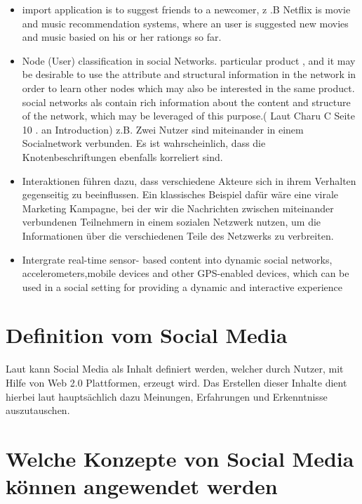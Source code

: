 \begin{itemize}
\item import application is to suggest  friends to a newcomer, z .B Netflix   is movie and music recommendation systems, where an user is suggested new movies and music basied on his or her rationgs so far.
\item Node (User) classification in social Networks. particular product , and it may be desirable to use the attribute and structural information in the network in order to learn other nodes which may also be interested in the same product. social networks als contain rich information about the content and structure of the network, which may be leveraged of this purpose.( Laut Charu C Seite 10 . an Introduction) z.B.  Zwei Nutzer sind miteinander in einem Socialnetwork verbunden. Es ist wahrscheinlich, dass die Knotenbeschriftungen ebenfalls korreliert sind.
\item Interaktionen führen dazu, dass verschiedene Akteure sich in ihrem Verhalten gegenseitig zu beeinflussen. Ein klassisches Beispiel dafür wäre eine virale Marketing Kampagne, bei der wir die Nachrichten zwischen miteinander verbundenen Teilnehmern in einem sozialen Netzwerk nutzen, um die Informationen über die verschiedenen Teile des Netzwerks zu verbreiten.
\item Intergrate real-time sensor- based content into dynamic social networks, accelerometers,mobile devices and other GPS-enabled devices, which can be used in a social setting for providing a dynamic and interactive experience
\end{itemize}


\section{Definition vom Social Media}

Laut \textcite[S. 8]{turban:sc} kann Social Media als Inhalt definiert werden, welcher durch Nutzer, mit Hilfe von Web 2.0 Plattformen, erzeugt wird. Das Erstellen dieser Inhalte dient hierbei laut \textcite[S. 8]{turban:sc} hauptsächlich dazu Meinungen, Erfahrungen und Erkenntnisse auszutauschen.


\section{Welche Konzepte von Social Media können angewendet werden}

